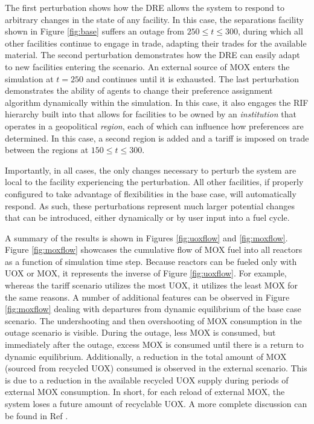 The first perturbation shows how the \gls{DRE} allows the system to respond to
arbitrary changes in the state of any facility.  In this case, the separations
facility shown in Figure \ref{fig:base} suffers an outage from $250 \leq t
\leq 300$, during which all other facilities continue to engage in trade,
adapting their trades for the available material.  The second perturbation
demonstrates how the \gls{DRE} can easily adapt to new facilities entering the
scenario.  An external source of MOX enters the simulation at $t = 250$ and
continues until it is exhausted.  The last perturbation demonstrates the
ability of agents to change their preference assignment algorithm dynamically
within the simulation.  In this case, it also engages the \gls{RIF} hierarchy
built into \Cyclus{} that allows for facilities to be owned by an
\textit{institution} that operates in a geopolitical \textit{region}, each of
which can influence how preferences are
determined.  In this case, a second region is
added and a tariff is imposed on trade between the regions at $150 \leq t \leq
300$.

Importantly, in all cases, the only changes necessary to perturb the system
are local to the facility experiencing the perturbation.  All other
facilities, if properly configured to take advantage of flexibilities in the
base case, will automatically respond.  As such, these perturbations represent
much larger potential changes that can be introduced, either dynamically or by
user input into a fuel cycle.

A summary of the results is shown in Figures \ref{fig:uoxflow} and
\ref{fig:moxflow}.  Figure \ref{fig:moxflow} showcases the cumulative flow of
MOX fuel into all reactors as a function of simulation time step. Because
reactors can be fueled only with UOX or MOX, it represents the inverse of
Figure \ref{fig:uoxflow}. For example, whereas the tariff scenario utilizes
the most UOX, it utilizes the least MOX for the same reasons. A number of
additional features can be observed in Figure \ref{fig:moxflow} dealing with
departures from dynamic equilibrium of the base case scenario. The
undershooting and then overshooting of MOX consumption in the outage scenario
is visible. During the outage, less MOX is consumed, but immediately after the
outage, excess MOX is consumed until there is a return to dynamic
equilibrium. Additionally, a reduction in the total amount of MOX (sourced
from recycled UOX) consumed is observed in the external scenario. This is due
to a reduction in the available recycled UOX supply during periods of external
MOX consumption. In short, for each reload of external MOX, the system loses a
future amount of recyclable UOX.  A more complete discussion can be found in
Ref .

